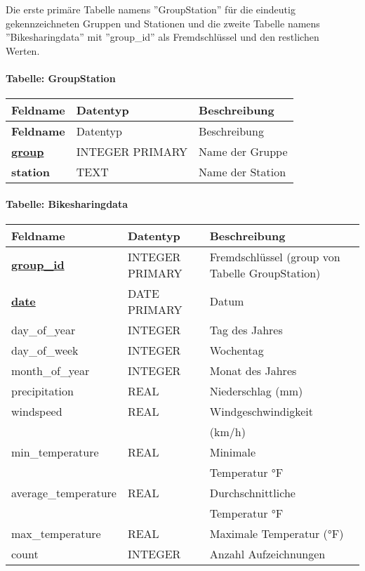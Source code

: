 \documentclass[11pt]{article}
\begin{document}
Die erste primäre Tabelle namens ''GroupStation'' für die eindeutig \\ gekennzeichneten Gruppen und Stationen und die zweite Tabelle namens ''Bikesharingdata'' mit ''group\_id'' als Fremdschlüssel und den restlichen \\ Werten.

\paragraph*{Tabelle: GroupStation}

\begin{longtable}{|>{\bfseries}l|l|l|}
\hline
Feldname & \textbf{Datentyp} & \textbf{Beschreibung} \\
\hline
\endfirsthead
\hline
Feldname & Datentyp & Beschreibung \\
\hline
\endhead
\hline
\underline{group} & INTEGER PRIMARY & Name der Gruppe \\
station & TEXT & Name der Station \\
\hline
\end{longtable}
\newpage

\paragraph*{Tabelle: Bikesharingdata} 
\RaggedRight
\begin{longtable}{|>{\raggedright\arraybackslash}p{3.5cm}|>{\raggedright\arraybackslash}p{3cm}|>{\raggedright\arraybackslash}p{4cm}|}
\hline 
\textbf{Feldname} & \textbf{Datentyp} & \textbf{Beschreibung} \\
\hline
\underline{\textbf{group\_id}} & INTEGER PRIMARY & Fremdschlüssel (group von Tabelle GroupStation) \\ 
\underline{\textbf{date}} & DATE PRIMARY & Datum \\ 
day\_of\_year & INTEGER & Tag des Jahres \\ 
day\_of\_week & INTEGER & Wochentag \\
month\_of\_year & INTEGER & Monat des Jahres \\ 
precipitation & REAL & Niederschlag (mm) \\ 
windspeed & REAL & Windgeschwindigkeit \\ 
    &   & (km/h) \\
min\_temperature & REAL & Minimale \\ 
    &   & Temperatur °F \\
average\_temperature & REAL & Durchschnittliche \\
    &   & Temperatur °F \\
max\_temperature & REAL & Maximale Temperatur (°F) \\ 
count & INTEGER & Anzahl Aufzeichnungen \\ 
\hline 
\end{longtable}
\end{document}
